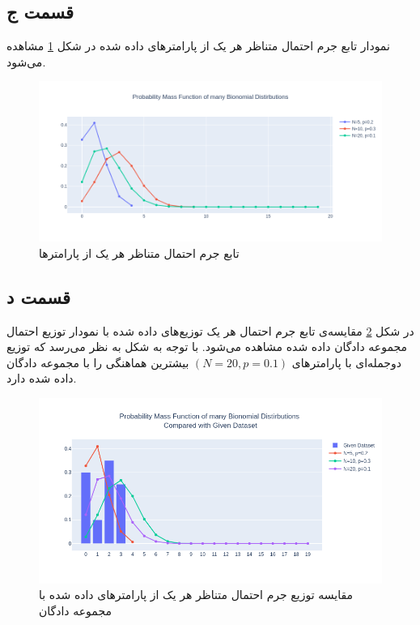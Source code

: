 \documentclass{article}
\begin{document}
\subsection*{قسمت ج}

نمودار تابع جرم احتمال متناظر هر یک از پارامتر‌های داده شده در شکل \ref{probability-mass-function} مشاهده می‌شود.

\begin{figure}[h]
    \centering
    \includegraphics[scale=0.3]{images/q4/pmf.png}
    \caption{تابع جرم احتمال متناظر هر یک از پارامتر‌ها}
    \label{probability-mass-function}
\end{figure}

\subsection*{قسمت د}

در شکل \ref{probability-mass-function-compared-with-given-dataset} مقایسه‌ی
تابع جرم احتمال هر یک توزیع‌های داده شده با نمودار توزیع احتمال مجموعه دادگان
داده شده مشاهده می‌شود. با توجه به شکل به نظر می‌رسد که توزیع دوجمله‌ای با پارامتر‌های
$(N=20,p=0.1)$ بیشترین هماهنگی را با مجموعه دادگان داده شده دارد.

\begin{figure}[h]
    \centering
    \includegraphics[scale=0.3]{images/q4/pmf_compared_with_dataset.png}
    \caption{مقایسه توزیع جرم احتمال متناظر هر یک از پارامتر‌های داده شده با مجموعه دادگان}
    \label{probability-mass-function-compared-with-given-dataset}
\end{figure}
\end{document}
